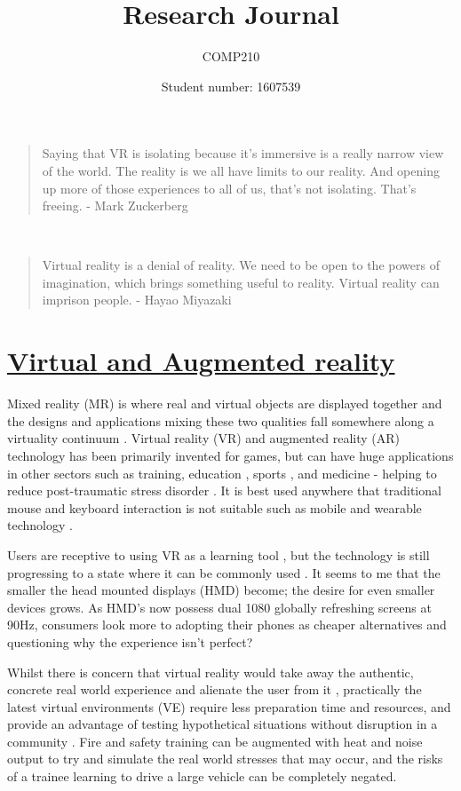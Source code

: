 \documentclass{scrartcl}
\title
{Research Journal}
\subtitle{COMP210}
\author{Student number: 1607539}
\begin{document}
\maketitle

\blockquote {Saying that VR is isolating because it's immersive is a really narrow view of the world. The reality is we all have limits to our reality. And opening up more of those experiences to all of us, that's not isolating. That's freeing. - Mark Zuckerberg}\\
\indent\blockquote {Virtual reality is a denial of reality. We need to be open to the powers of imagination, which brings something useful to reality. Virtual reality can imprison people. - Hayao Miyazaki}

\section*{\underline{Virtual and Augmented reality}}

Mixed reality (MR) is where real and virtual objects are displayed together \cite{milgram1994taxonomy} and the designs and applications mixing these two qualities fall somewhere along a virtuality continuum \cite{venta2014investigating}. Virtual reality (VR) and augmented reality (AR) technology has been primarily invented for games, but can have huge applications in other sectors such as training, education \cite{mentzelopoulos2015hardware}, sports \cite{azuma2001recent}, and medicine - helping to reduce post-traumatic stress disorder \cite{rothbaum2001virtual}. It is best used anywhere that traditional mouse and keyboard interaction is not suitable such as mobile and wearable technology \cite{keir2006gesture}. 

Users are receptive to using VR as a learning tool \cite{blackledge2012evaluation}, but the technology is still progressing to a state where it can be commonly used \cite{huang2013mobile}. It seems to me that the smaller the head mounted displays (HMD) become; the desire for even smaller devices grows. As HMD's now possess dual 1080 globally refreshing screens at 90Hz, consumers look more to adopting their phones as cheaper alternatives and questioning why the experience isn't perfect?

Whilst there is concern that virtual reality would take away the authentic, concrete real world experience and alienate the user from it \cite{venta2014investigating}, practically the latest virtual environments (VE) require less preparation time and resources, and provide an advantage of testing hypothetical situations without disruption in a community \cite{hvannberg2012exploitation}. Fire and safety training can be augmented with heat and noise output to try and simulate the real world stresses that may occur, and the risks of a trainee learning to drive a large vehicle can be completely negated.
\end{document}
